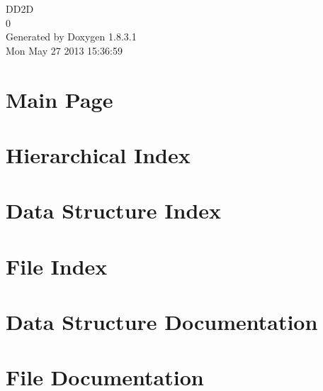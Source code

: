 \documentclass{book}
\begin{document}
\hypersetup{pageanchor=false,citecolor=blue}
\begin{titlepage}
\vspace*{7cm}
\begin{center}
{\Large D\-D2\-D \\[1ex]\large 0 }\\
\vspace*{1cm}
{\large Generated by Doxygen 1.8.3.1}\\
\vspace*{0.5cm}
{\small Mon May 27 2013 15:36:59}\\
\end{center}
\end{titlepage}
\clearemptydoublepage
{}
\tableofcontents
\clearemptydoublepage
{}
\hypersetup{pageanchor=true,citecolor=blue}
\chapter{Main Page}
\label{index}\hypertarget{index}{}
\chapter{Hierarchical Index}

\chapter{Data Structure Index}

\chapter{File Index}

\chapter{Data Structure Documentation}








\chapter{File Documentation}




















\printindex
\end{document}
